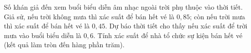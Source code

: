 \begin{bt}%
	Số khán giả đến xem buổi biểu diễn âm nhạc ngoài trời phụ thuộc vào  thời tiết. Giả sử, nếu trời không mưa thì xác suất để bán hết vé là $0{,}85$; còn nếu trời mưa thì xác suất để bán hết vé là $0{,}45$. Dự báo thời tiết cho thấy nếu xác suất để trời mưa vào buổi biểu diễn là $0{,}6$. Tính xác suất để nhà tổ chức sự kiện bán hết vé (kết quả làm tròn đến hàng phần trăm).
\end{bt}

